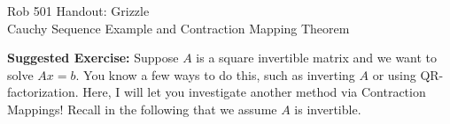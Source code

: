 \documentclass[letterpaper]{article}
\begin{document}
\baselineskip=48pt  %


\setlength{\parskip}{.3in}
\setlength{\itemsep}{.3in}

\pagestyle{plain}

{\Large \bf
\begin{center}
Rob 501 Handout: Grizzle \\
Cauchy Sequence Example and Contraction Mapping Theorem
\end{center}
}



\Large


\textbf{Suggested Exercise:} Suppose $A$ is a square invertible matrix and we want to solve $Ax=b$. You know a few ways to do this, such as inverting $A$ or using QR-factorization. Here, I will let you investigate another method via Contraction Mappings! Recall in the following that we assume $A$ is invertible.
\end{document}
